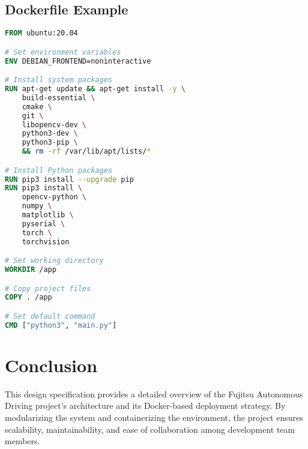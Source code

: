 \documentclass[12pt]{article}
\begin{document}
\subsection{Dockerfile Example}

\begin{lstlisting}[language=Dockerfile]
FROM ubuntu:20.04

# Set environment variables
ENV DEBIAN_FRONTEND=noninteractive

# Install system packages
RUN apt-get update && apt-get install -y \
    build-essential \
    cmake \
    git \
    libopencv-dev \
    python3-dev \
    python3-pip \
    && rm -rf /var/lib/apt/lists/*

# Install Python packages
RUN pip3 install --upgrade pip
RUN pip3 install \
    opencv-python \
    numpy \
    matplotlib \
    pyserial \
    torch \
    torchvision

# Set working directory
WORKDIR /app

# Copy project files
COPY . /app

# Set default command
CMD ["python3", "main.py"]
\end{lstlisting}

\section{Conclusion}

This design specification provides a detailed overview of the Fujitsu Autonomous Driving project's architecture and its Docker-based deployment strategy. By modularizing the system and containerizing the environment, the project ensures scalability, maintainability, and ease of collaboration among development team members.
\end{document}
